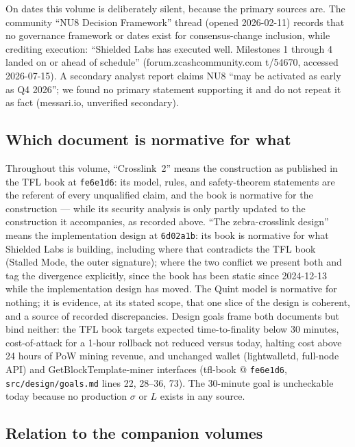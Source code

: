 \documentclass[11pt,a4paper]{article}
\theoremstyle{definition}
\begin{document}
On dates this volume is deliberately silent, because the primary sources
are. The community ``NU8 Decision Framework'' thread (opened 2026-02-11)
records that no governance framework or dates exist for
consensus-change inclusion, while crediting execution: ``Shielded Labs
has executed well. Milestones 1 through 4 landed on or ahead of
schedule'' (forum.zcashcommunity.com t/54670, accessed 2026-07-15). A
secondary analyst report claims NU8 ``may be activated as early as Q4
2026''; we found no primary statement supporting it and do not repeat it
as fact (messari.io, unverified secondary).

\subsection{Which document is normative for what}\label{sec:xl-normative}

Throughout this volume, ``Crosslink~2'' means the construction as
published in the TFL book at \texttt{fe6e1d6}: its model, rules, and
safety-theorem statements are the referent of every unqualified claim,
and the book is normative for the construction --- while its security
analysis is only partly updated to the construction it accompanies, as
recorded above. ``The zebra-crosslink design'' means the implementation
design at \texttt{6d02a1b}: its book is normative for what Shielded Labs
is building, including where that contradicts the TFL book (Stalled
Mode, the outer signature); where the two conflict we present both and
tag the divergence explicitly, since the book has been static since
2024-12-13 while the implementation design has moved. The Quint model is
normative for nothing; it is evidence, at its stated scope, that one
slice of the design is coherent, and a source of recorded discrepancies.
Design goals frame both documents but bind neither: the TFL book targets
expected time-to-finality below 30 minutes, cost-of-attack for a 1-hour
rollback not reduced versus today, halting cost above 24 hours of PoW
mining revenue, and unchanged wallet (lightwalletd, full-node API) and
GetBlockTemplate-miner interfaces (tfl-book @ \texttt{fe6e1d6},
\texttt{src/design/goals.md} lines 22, 28--36, 73). The 30-minute goal
is uncheckable today because no production $\sigma$ or $L$ exists in any
source.

\subsection{Relation to the companion volumes}\label{sec:xl-siblings}
\end{document}
